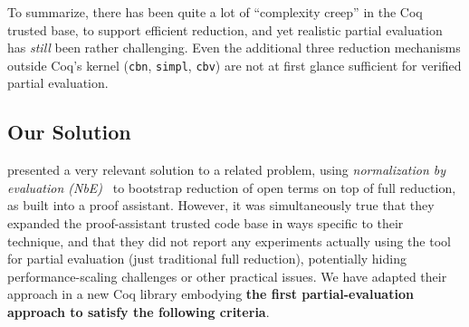 
To summarize, there has been quite a lot of ``complexity creep'' in the Coq trusted base, to support efficient reduction, and yet realistic partial evaluation has \emph{still} been rather challenging.
Even the additional three reduction mechanisms outside Coq's kernel (\texttt{cbn}, \texttt{simpl}, \texttt{cbv}) are not at first glance sufficient for verified partial evaluation.


\subsection{Our Solution}\label{sec:our-solution}

\textcite{Aehlig} presented a very relevant solution to a related problem, using \emph{normalization by evaluation (NbE)}~\cite{NbE} to bootstrap reduction of open terms on top of full reduction, as built into a proof assistant.
However, it was simultaneously true that they expanded the proof-assistant trusted code base in ways specific to their technique, and that they did not report any experiments actually using the tool for partial evaluation (just traditional full reduction), potentially hiding performance-scaling challenges or other practical issues.
We have adapted their approach in a new Coq library embodying \textbf{the first partial-evaluation approach to satisfy the following criteria}.


